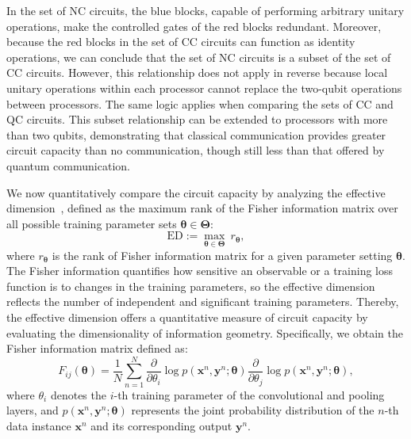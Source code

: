 \documentclass[aps,prx,reprint,amsmath,amssymb,superscriptaddress,nobibnotes,showpacs]{revtex4-2}
\begin{document}
In the set of NC circuits, the blue blocks, capable of performing arbitrary unitary operations, make the controlled gates of the red blocks redundant. Moreover, because the red blocks in the set of CC circuits can function as identity operations, we can conclude that the set of NC circuits is a subset of the set of CC circuits. However, this relationship does not apply in reverse because local unitary operations within each processor cannot replace the two-qubit operations between processors. The same logic applies when comparing the sets of CC and QC circuits. This subset relationship can be extended to processors with more than two qubits, demonstrating that classical communication provides greater circuit capacity than no communication, though still less than that offered by quantum communication.


We now quantitatively compare the circuit capacity by analyzing the effective dimension~\cite{abbas2021power}, defined as the maximum rank of the Fisher information matrix over all possible training parameter sets $\boldsymbol{\theta} \in \boldsymbol{\Theta}$:
\begin{equation}
\label{ED}
\text{ED}:=\underset{\boldsymbol{\theta} \in \boldsymbol{\Theta}}{\max}\ r_{\boldsymbol{\theta}},
\end{equation}
where $r_{\boldsymbol{\theta}}$ is the rank of Fisher information matrix for a given parameter setting  $\boldsymbol{\theta}$. The Fisher information quantifies how sensitive an observable or a training loss function is to changes in the training parameters, so the effective dimension reflects the number of independent and significant training parameters. Thereby, the effective dimension offers a quantitative measure of circuit capacity by evaluating the dimensionality of information geometry. Specifically, we obtain the Fisher information matrix defined as:
\begin{equation}
\label{fisher}
F_{ij}(\boldsymbol{\theta})=\frac{1}{N} \sum_{n=1}^{N} \frac{\partial}{\partial \theta_i} \log p(\boldsymbol{x}^{n}, \boldsymbol{y}^{n} ; \boldsymbol{\theta}) \frac{\partial}{\partial \theta_j} \log p(\boldsymbol{x}^{n}, \boldsymbol{y}^{n} ; \boldsymbol{\theta}),
\end{equation}
where $\theta_i$ denotes the $i$-th training parameter of the  convolutional and pooling layers, and $p(\boldsymbol{x}^n,\boldsymbol{y}^n;\boldsymbol{\theta})$ represents the joint probability distribution of the $n$-th data instance $\boldsymbol{x}^n$ and its corresponding output $\boldsymbol{y}^n$.
\end{document}
